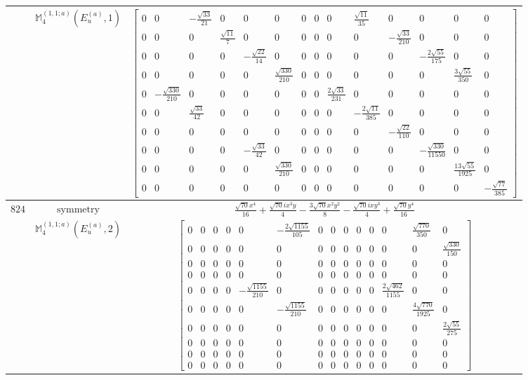 \documentclass[fleqn,8pt,landscape]{jsarticle}
\begin{document}
\begin{longtable}{ccc}
$  $ & $ \mathbb{M}_{4}^{(1,1;a)}(E_{u}^{(a)},1) $ & $ \begin{bmatrix} 0 & 0 & - \frac{\sqrt{33}}{21} & 0 & 0 & 0 & 0 & 0 & 0 & \frac{\sqrt{11}}{35} & 0 & 0 & 0 & 0 \\ 0 & 0 & 0 & \frac{\sqrt{11}}{7} & 0 & 0 & 0 & 0 & 0 & 0 & - \frac{\sqrt{33}}{210} & 0 & 0 & 0 \\ 0 & 0 & 0 & 0 & - \frac{\sqrt{22}}{14} & 0 & 0 & 0 & 0 & 0 & 0 & - \frac{2 \sqrt{55}}{175} & 0 & 0 \\ 0 & 0 & 0 & 0 & 0 & \frac{\sqrt{330}}{210} & 0 & 0 & 0 & 0 & 0 & 0 & \frac{3 \sqrt{55}}{350} & 0 \\ 0 & - \frac{\sqrt{330}}{210} & 0 & 0 & 0 & 0 & 0 & 0 & \frac{2 \sqrt{33}}{231} & 0 & 0 & 0 & 0 & 0 \\ 0 & 0 & \frac{\sqrt{33}}{42} & 0 & 0 & 0 & 0 & 0 & 0 & - \frac{2 \sqrt{11}}{385} & 0 & 0 & 0 & 0 \\ 0 & 0 & 0 & 0 & 0 & 0 & 0 & 0 & 0 & 0 & - \frac{\sqrt{22}}{110} & 0 & 0 & 0 \\ 0 & 0 & 0 & 0 & - \frac{\sqrt{33}}{42} & 0 & 0 & 0 & 0 & 0 & 0 & - \frac{\sqrt{330}}{11550} & 0 & 0 \\ 0 & 0 & 0 & 0 & 0 & \frac{\sqrt{330}}{210} & 0 & 0 & 0 & 0 & 0 & 0 & \frac{13 \sqrt{55}}{1925} & 0 \\ 0 & 0 & 0 & 0 & 0 & 0 & 0 & 0 & 0 & 0 & 0 & 0 & 0 & - \frac{\sqrt{77}}{385} \end{bmatrix} $ \\ \hline
$ 824 $ & $ \text{symmetry} $ & $ \frac{\sqrt{70} x^{4}}{16} + \frac{\sqrt{70} i x^{3} y}{4} - \frac{3 \sqrt{70} x^{2} y^{2}}{8} - \frac{\sqrt{70} i x y^{3}}{4} + \frac{\sqrt{70} y^{4}}{16} $ \\
$  $ & $ \mathbb{M}_{4}^{(1,1;a)}(E_{u}^{(a)},2) $ & $ \begin{bmatrix} 0 & 0 & 0 & 0 & 0 & - \frac{2 \sqrt{1155}}{105} & 0 & 0 & 0 & 0 & 0 & 0 & \frac{\sqrt{770}}{350} & 0 \\ 0 & 0 & 0 & 0 & 0 & 0 & 0 & 0 & 0 & 0 & 0 & 0 & 0 & \frac{\sqrt{330}}{150} \\ 0 & 0 & 0 & 0 & 0 & 0 & 0 & 0 & 0 & 0 & 0 & 0 & 0 & 0 \\ 0 & 0 & 0 & 0 & 0 & 0 & 0 & 0 & 0 & 0 & 0 & 0 & 0 & 0 \\ 0 & 0 & 0 & 0 & - \frac{\sqrt{1155}}{210} & 0 & 0 & 0 & 0 & 0 & 0 & \frac{2 \sqrt{462}}{1155} & 0 & 0 \\ 0 & 0 & 0 & 0 & 0 & - \frac{\sqrt{1155}}{210} & 0 & 0 & 0 & 0 & 0 & 0 & \frac{4 \sqrt{770}}{1925} & 0 \\ 0 & 0 & 0 & 0 & 0 & 0 & 0 & 0 & 0 & 0 & 0 & 0 & 0 & \frac{2 \sqrt{55}}{275} \\ 0 & 0 & 0 & 0 & 0 & 0 & 0 & 0 & 0 & 0 & 0 & 0 & 0 & 0 \\ 0 & 0 & 0 & 0 & 0 & 0 & 0 & 0 & 0 & 0 & 0 & 0 & 0 & 0 \\ 0 & 0 & 0 & 0 & 0 & 0 & 0 & 0 & 0 & 0 & 0 & 0 & 0 & 0 \end{bmatrix} $ \\ \hline

\end{longtable}
\end{document}

